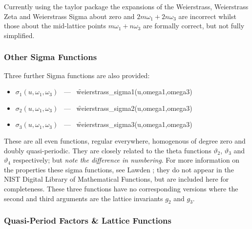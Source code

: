 Currently using the taylor package the expansions of the Weierstrass,
Weierstrass Zeta and Weierstrass Sigma about zero and $2m\omega_1+2n\omega_3$
are incorrect  whilst those about the mid-lattice points $m\omega_1+n\omega_3$
are formally correct, but not fully simplified.

\subsubsection{Other Sigma Functions}
\hypertarget{SIGMA1}{}
\hypertarget{operator:WEIERSTRASS_SIGMA1}{}
\hypertarget{operator:WEIERSTRASS_SIGMA2}{}
\hypertarget{operator:WEIERSTRASS_SIGMA3}{}

Three further Sigma functions are also provided:
\begin{itemize}
\item $\sigma_1(u, \omega_1, \omega_3)$ \ --- \ \f{weierstrass\_sigma1(u,omega1,omega3)}
\item $\sigma_2(u, \omega_1, \omega_3)$ \ --- \ \f{weierstrass\_sigma2(u,omega1,omega3)}
\item $\sigma_3(u, \omega_1, \omega_3)$ \ --- \ \f{weierstrass\_sigma3(u,omega1,omega3)}
\end{itemize}
These are all even functions, regular everywhere, homogenous of degree zero and doubly quasi-periodic. They are closely related to the
theta functions $\vartheta_2$, $\vartheta_3$ and $\vartheta_4$ respectively; but \emph{note the difference in numbering}.
For more information on the properties these sigma functions, see Lawden \cite{Lawden:89};
they do not appear in the NIST Digital Library of Mathematical Functions, but are included here for completeness.
These three functions have no corresponding versions where the second and third
arguments are the lattice invariants $g_2$ and $g_3$.

\subsubsection{ Quasi-Period Factors \& Lattice Functions}
\hypertarget{ETA}{}
\hypertarget{operator:LATTICE_E1}{}
\hypertarget{operator:LATTICE_E2}{}
\hypertarget{operator:LATTICE_E3}{}
\hypertarget{operator:LATTICE_G}{}
\hypertarget{operator:LATTICE_DELTA}{}
\hypertarget{operator:LATTICE_G2}{}
\hypertarget{operator:LATTICE_G3}{}

